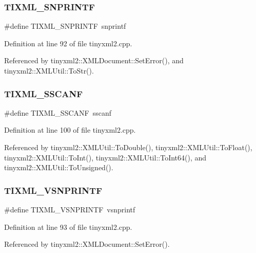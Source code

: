 \subsubsection{T\+I\+X\+M\+L\+\_\+\+S\+N\+P\+R\+I\+N\+TF}
{\footnotesize\ttfamily \#define T\+I\+X\+M\+L\+\_\+\+S\+N\+P\+R\+I\+N\+TF~snprintf}



Definition at line 92 of file tinyxml2.\+cpp.



Referenced by tinyxml2\+::\+X\+M\+L\+Document\+::\+Set\+Error(), and tinyxml2\+::\+X\+M\+L\+Util\+::\+To\+Str().

\mbox{\label{tinyxml2_8cpp_a96f54d7c855ad92e705510904a040393}} 
\subsubsection{T\+I\+X\+M\+L\+\_\+\+S\+S\+C\+A\+NF}
{\footnotesize\ttfamily \#define T\+I\+X\+M\+L\+\_\+\+S\+S\+C\+A\+NF~sscanf}



Definition at line 100 of file tinyxml2.\+cpp.



Referenced by tinyxml2\+::\+X\+M\+L\+Util\+::\+To\+Double(), tinyxml2\+::\+X\+M\+L\+Util\+::\+To\+Float(), tinyxml2\+::\+X\+M\+L\+Util\+::\+To\+Int(), tinyxml2\+::\+X\+M\+L\+Util\+::\+To\+Int64(), and tinyxml2\+::\+X\+M\+L\+Util\+::\+To\+Unsigned().

\mbox{\label{tinyxml2_8cpp_a924d10d64b020e9dbcd2b8b024768608}} 
\subsubsection{T\+I\+X\+M\+L\+\_\+\+V\+S\+N\+P\+R\+I\+N\+TF}
{\footnotesize\ttfamily \#define T\+I\+X\+M\+L\+\_\+\+V\+S\+N\+P\+R\+I\+N\+TF~vsnprintf}



Definition at line 93 of file tinyxml2.\+cpp.



Referenced by tinyxml2\+::\+X\+M\+L\+Document\+::\+Set\+Error().

